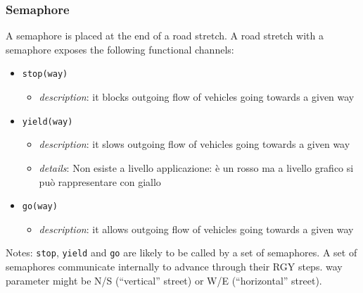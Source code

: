 \subsubsection{Semaphore}
A semaphore is placed at the end of a road stretch.
A road stretch with a semaphore exposes the following functional channels:
\begin{itemize}
	\item \texttt{stop(way)}
	\begin{itemize}
		\item \textit{description}: it blocks outgoing flow of vehicles going towards a given way
	\end{itemize}
	\item \texttt{yield(way)}
	\begin{itemize}
		\item \textit{description}: it slows outgoing flow of vehicles going towards a given way
		\item \textit{details}: Non esiste a livello applicazione: è un rosso ma a livello grafico si può rappresentare con giallo
	\end{itemize}
	\item \texttt{go(way)}
	\begin{itemize}
		\item \textit{description}: it allows outgoing flow of vehicles going towards a given way
	\end{itemize}
\end{itemize}
Notes:
\texttt{stop}, \texttt{yield} and \texttt{go} are likely to be called by a set of semaphores.
A set of semaphores communicate internally to advance through their RGY steps.
way parameter might be N/S (“vertical” street) or W/E (“horizontal” street).
